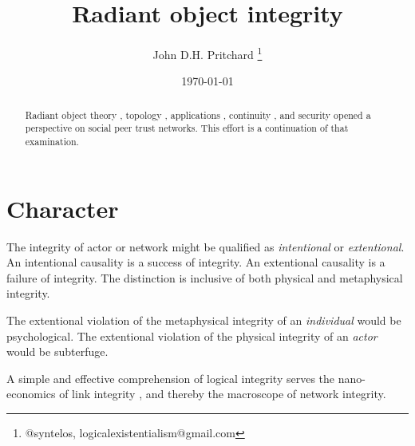\documentclass[12pt,twocolumn]{article}
\begin{document}
\title{Radiant object integrity}

\author{John D.H. Pritchard \thanks{@syntelos, logicalexistentialism@gmail.com}}

\date{\today}

\maketitle


\begin{abstract}

Radiant object theory \cite{ROTI}, topology \cite{ROTY}, applications
\cite{ROTA}, continuity \cite{ROTC}, and security \cite{ROTS} opened a
perspective on social peer trust networks.  This effort is a
continuation of that examination.
  
\end{abstract}


\section{Character}

The integrity of actor or network might be qualified as {\it
  intentional} or {\it extentional}.  An intentional causality is a
success of integrity.  An extentional causality is a failure of
integrity.  The distinction is inclusive of both physical and
metaphysical integrity.

The extentional violation of the metaphysical integrity of an {\it
  individual} would be psychological.  The extentional violation of
the physical integrity of an {\it actor} would be subterfuge.

A simple and effective comprehension of logical integrity serves the
nano-economics of link integrity \cite{ROTS}, and thereby the
macroscope of network integrity.

\appendix



\end{document}
